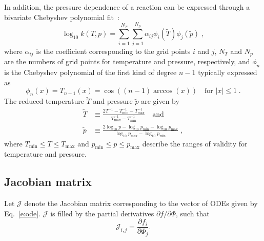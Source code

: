 \documentclass[preprint,12pt]{elsarticle}
\newcommand{ \dydx } [2] { \frac{ \partial #1 }{ \partial #2 } }
\begin{document}
In addition, the pressure dependence of a reaction can be expressed through a bivariate Chebyshev polynomial fit~\cite{Venkatesh:1997hv,Venkatesh:1997ik,Venkatesh:2000gj,chemkin:2012,Goodwin:2014aa}:
\begin{equation}
\log_{10} k(T, p) = \sum_{i = 1}^{N_T} \sum_{j = 1}^{N_p} \alpha_{ij} \phi_i (\tilde{T}) \phi_j \left(\tilde{p}\right) \label{e:cheb} \;,
\end{equation}
where $\alpha_{ij}$ is the coefficient corresponding to the grid points $i$ and $j$, $N_T$ and $N_p$ are the numbers of grid points for temperature and pressure, respectively, and $\phi_n$ is the Chebyshev polynomial of the first kind of degree $n - 1$ typically expressed as
\begin{equation}
\phi_n (x) = T_{n-1} (x) = \cos \left( (n - 1) \arccos (x) \right) \quad \text{for } |x| \leq 1 \;.
\end{equation}
The reduced temperature $\tilde{T}$ and pressure $\tilde{p}$ are given by 
\begin{align}
\tilde{T} &\equiv \frac{2 T^{-1} - T^{-1}_{\min} - T^{-1}_{\max}}{T^{-1}_{\max} - T^{-1}_{\min}} \quad\text{and} \\
\tilde{p} &\equiv \frac{2\log_{10} p - \log_{10} p_{\min} - \log_{10} p_{\max}}{\log_{10} p_{\max} - \log_{10} p_{\min}} \;,
\end{align}
where $T_{\min} \leq T \leq T_{\max}$ and $p_{\min} \leq p \leq p_{\max}$ describe the ranges of validity for temperature and pressure.


\subsection{Jacobian matrix}

Let $\mathcal{J}$ denote the Jacobian matrix corresponding to the vector of ODEs given by Eq.~\eqref{e:ode}. $\mathcal{J}$ is filled by the partial derivatives $\partial f / \partial \Phi$, such that
\begin{equation}
\mathcal{J}_{i,j} = \dydx{f_i}{\Phi_j} .
\end{equation}

\end{document}
